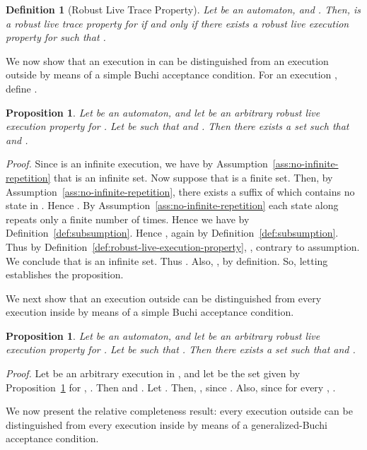 \documentclass[11pt]{article}
\newcommand{\bp}{\begin{proposition}}
\newcommand{\ep}{\end{proposition}}
\newcommand{\bpr}{\begin{proof}}
\newcommand{\epr}{\end{proof}}
\newcommand{\bd}{\begin{definition}}
\newcommand{\ed}{\end{definition}}
\newtheorem{proposition}[theorem]{Proposition}
\newtheorem{definition}{Definition}
\newenvironment{proof}{\vspace{-1.0ex}\textit{Proof.} }
                      {\hfill{}}
\begin{document}
\bd[Robust Live Trace Property]
\label{def:robust-live-trace-property}
Let  be an automaton, and . Then,
 is a \emph{robust live trace property} for  if and only if
there exists a robust live execution property  for  such that 
.
\ed




We now show that an execution in  can be distinguished
from an execution outside  by means of a simple Buchi
acceptance condition.
For an execution , define .



\bp
\label{prop:distinguish-two-execs}
Let  be an automaton, and let  be an arbitrary
robust live execution property for .
Let   be such that 
 and . 
Then there exists a set  such that
 and .
\ep
\bpr
Since  is an infinite execution, we have by 
Assumption~\ref{ass:no-infinite-repetition} that  is an infinite set. 
Now suppose that  is a finite set.
Then, by Assumption~\ref{ass:no-infinite-repetition}, there exists a suffix 
 of  which contains no state in .
Hence . 
By Assumption~\ref{ass:no-infinite-repetition}
each state along  repeats only a finite number of times. 
Hence we have  by Definition~\ref{def:subsumption}.
Hence , again by Definition~\ref{def:subsumption}.
Thus by Definition~\ref{def:robust-live-execution-property}, ,
contrary to assumption. 
We conclude that  is an infinite set.
Thus .
Also, , by definition.
So, letting  establishes the proposition.
\epr

We next show that an execution outside  can be distinguished
from every execution inside  by means of a simple Buchi
acceptance condition.

\bp
\label{prop:distinguish-nonlive-exec}
Let  be an automaton, and let  be an arbitrary
robust live execution property for .
Let   be such that . 
Then there exists a set  such that
 and
.
\ep
\bpr
Let  be an arbitrary execution in , and let  be the set
given by Proposition~\ref{prop:distinguish-two-execs} for , .
Then  and .
Let . Then,
, since .
Also, 
 since  for every 
, . 
\epr

We now present the relative completeness result: every 
execution outside  can be distinguished
from every execution inside  by means of a 
generalized-Buchi acceptance condition.
\end{document}
